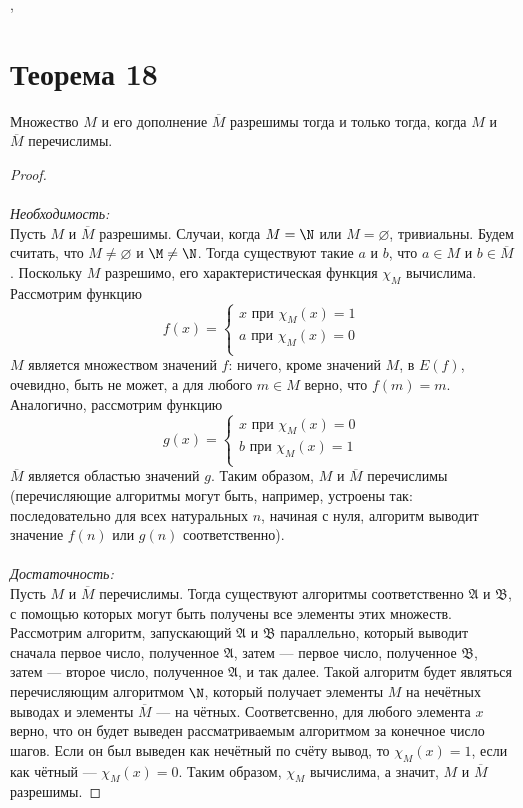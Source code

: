 \documentclass[a4paper,12pt]{article}
\begin{document}
    \sep
    \section {Теорема 18}
    \begin{theorem}
    Множество $M$ и его дополнение $\overline{M}$ разрешимы тогда и только тогда, когда $M$ и $\overline{M}$ перечислимы.
    \end{theorem}
    \begin{proof}
    \strut\\\\\textit{Необходимость:}\smallskip\\
    Пусть $M$ и $\overline{M}$ разрешимы. Случаи, когда $M=\N$ или $M=\varnothing$, тривиальны. Будем считать, что $M\ne\varnothing$ и $\M\ne\N$. Тогда существуют такие $a$ и $b$, что $a\in M$ и $b\in\overline{M}$. Поскольку $M$ разрешимо, его характеристическая функция $\chi_M$ вычислима. Рассмотрим функцию 
    $$f(x) = 
    \begin{cases}
    x \text{ при } \chi_M(x) = 1 \\
    a \text{ при } \chi_M(x) = 0 \\
    \end{cases}
    $$
    $M$ является множеством значений $f$: ничего, кроме значений $M$, в $E(f)$, очевидно, быть не может, а для любого $m\in M$ верно, что $f(m)=m$. Аналогично, рассмотрим функцию
    $$g(x) = 
    \begin{cases}
    x \text{ при } \chi_M(x) = 0 \\
    b \text{ при } \chi_M(x) = 1 \\
    \end{cases}
    $$
    $\overline{M}$ является областью значений $g$. Таким образом, $M$ и $\overline{M}$ перечислимы (перечисляющие алгоритмы могут быть, например, устроены так: последовательно для всех натуральных $n$, начиная с нуля, алгоритм выводит значение $f(n)$ или $g(n)$ соответственно).\\\\
    \textit{Достаточность:}\smallskip\\
    Пусть $M$ и $\overline{M}$ перечислимы. Тогда существуют алгоритмы соответственно $\mathfrak{A}$ и $\mathfrak{B}$, с помощью которых могут быть получены все элементы этих множеств. Рассмотрим алгоритм, запускающий $\mathfrak{A}$ и $\mathfrak{B}$ параллельно, который выводит сначала первое число, полученное $\mathfrak{A}$, затем --- первое число, полученное $\mathfrak{B}$, затем --- второе число, полученное $\mathfrak{A}$, и так далее. Такой алгоритм будет являться перечисляющим алгоритмом $\N$, который получает элементы $M$ на нечётных выводах и элементы $\overline{M}$ --- на чётных. Соответсвенно, для любого элемента $x$ верно, что он будет выведен рассматриваемым алгоритмом за конечное число шагов. Если он был выведен как нечётный по счёту вывод, то $\chi_M(x)=1$, если как чётный --- $\chi_M(x)=0$. Таким образом, $\chi_M$ вычислима, а значит, $M$ и $\overline{M}$ разрешимы.
    \end{proof}
    
\end{document}
